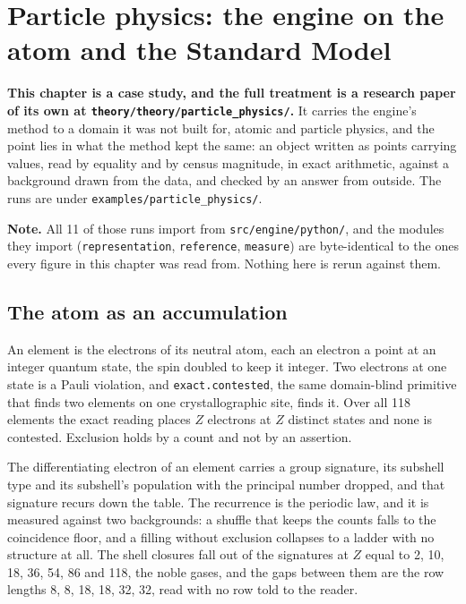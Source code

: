 \chapter{Particle physics: the engine on the atom and the Standard Model}

\textbf{This chapter is a case study, and the full treatment is a research paper of its own at
\texttt{theory/\allowbreak{}theory/\allowbreak{}particle\_physics/}.} It carries the engine's method to a domain it was not
built for, atomic and particle physics, and the point lies in what the method kept the same: an object
written as points carrying values, read by equality and by census magnitude, in exact arithmetic,
against a background drawn from the data, and checked by an answer from outside. The runs are under
\texttt{examples/\allowbreak{}particle\_physics/}.

\textbf{Note.} All 11 of those runs import from \texttt{src/\allowbreak{}engine/\allowbreak{}python/}, and the modules they
import (\texttt{representation}, \texttt{reference}, \texttt{measure}) are byte-identical to the ones
every figure in this chapter was read from. Nothing here is rerun against them.

\section{The atom as an accumulation}

An element is the electrons of its neutral atom, each an electron a point at an integer quantum state,
the spin doubled to keep it integer. Two electrons at one state is a Pauli violation, and
\texttt{exact.contested}, the same domain-blind primitive that finds two elements on one
crystallographic site, finds it. Over all 118 elements the exact reading places $Z$ electrons at $Z$
distinct states and none is contested. Exclusion holds by a count and not by an assertion.

The differentiating electron of an element carries a group signature, its subshell type and its
subshell's population with the principal number dropped, and that signature recurs down the table. The
recurrence is the periodic law, and it is measured against two backgrounds: a shuffle that keeps the
counts falls to the coincidence floor, and a filling without exclusion collapses to a ladder with no
structure at all. The shell closures fall out of the signatures at $Z$ equal to 2, 10, 18, 36, 54, 86
and 118, the noble gases, and the gaps between them are the row lengths 8, 8, 18, 18, 32, 32, read with
no row told to the reader.

